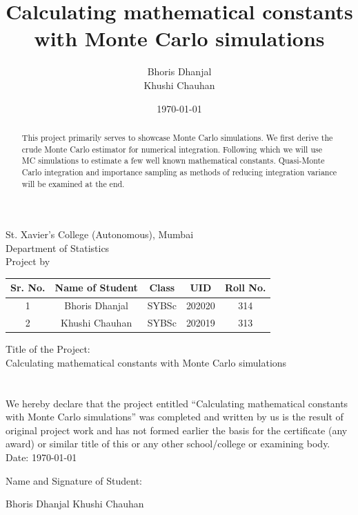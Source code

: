 \documentclass[12pt]{article}
\title{Calculating mathematical constants \\with Monte Carlo simulations}
\author{Bhoris Dhanjal\\ Khushi Chauhan }
\date{\today}
\makeatletter
\numberwithin{equation}{section}
\newcommand\frontmatter{%
    \cleardoublepage
  \pagenumbering{roman}}
\newcommand\mainmatter{%
    \cleardoublepage
  \pagenumbering{arabic}}
\makeatother
\begin{document}

\frontmatter
\begin{center}
    \large St. Xavier’s College (Autonomous), Mumbai\\
\large Department of Statistics\\
\large Project by\\
\begin{table}[h!]
\centering
\begin{tabular}{ccccc}
\hline
Sr. No. & Name of Student & Class & UID & Roll No. \\ \hline
1 & Bhoris Dhanjal & SYBSc & 202020 & 314 \\
2 & Khushi Chauhan & SYBSc & 202019 & 313 \\ \hline
\end{tabular}
\end{table}
Title of the Project:\\
Calculating mathematical constants with Monte Carlo simulations
\end{center}
\clearpage

\section*{}
\par We hereby declare that the project entitled “Calculating mathematical constants with Monte Carlo simulations” was completed and
written by us is the result of original project work and has not formed earlier the basis for
the certificate (any award) or similar title of this or any other school/college or examining
body.
\vfill
Date: \today \par
Name and Signature of Student:\\
\par Bhoris Dhanjal \hfill Khushi Chauhan\\
\clearpage

\section*{}
\clearpage
\tableofcontents


\mainmatter
\maketitle
\begin{abstract}
    This project primarily serves to showcase Monte Carlo simulations. We first derive the crude Monte Carlo estimator for numerical integration. Following which we will use MC simulations to estimate a few well known mathematical constants. Quasi-Monte Carlo integration and importance sampling as methods of reducing integration variance will be examined at the end.
\end{abstract}
\end{document}
